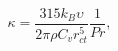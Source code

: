 \documentclass[12pt]{article}
\begin{document}
$$
  \kappa  = \frac{315k_B\upsilon }{2\pi \rho C_v r_{ct}^5}\frac{1}{Pr},
$$
\end{document}
